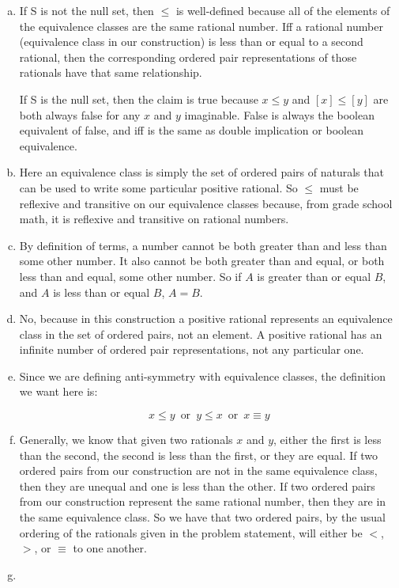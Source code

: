 \documentclass{article}
\begin{document}
\begin{enumerate}[a)]
\item
If S is not the null set, then $\le$ is well-defined because all of the elements
of
the equivalence classes are the same rational number. Iff a rational number
(equivalence class in our construction) is less than or equal to a second
rational, then the corresponding ordered pair representations of those rationals
have that same relationship. 

If S is the null set, then the claim is true because $x \le y$ and $[x] \le
[y]$ are both always false for any $x$ and $y$ imaginable. False is always
the boolean equivalent of false, and iff is the same as double implication
or boolean equivalence.

\item
Here an equivalence class is simply the set of ordered pairs of naturals that
can be used to
write some particular positive rational. So $\le$ must be reflexive and
transitive
on our equivalence classes because, from grade school math, it is reflexive and
transitive on rational numbers.

\item
By definition of terms, a number cannot be both greater than and less than some
other number. It also cannot be both greater than and equal, or both less than
and equal, some other number. So if $A$ is greater than or equal $B$, and $A$
is less than or equal $B$, $A = B$.

\item
No, because in this construction a positive rational represents an equivalence
class in the set of ordered pairs, not an element. A positive rational has an
infinite number of ordered pair representations, not any particular one.

\item
Since we are defining anti-symmetry with equivalence classes, the definition we
want here is:

\[
x \le y \hspace{6pt} \text{or} \hspace{6pt} y \le x \hspace{6pt} \text{or}
\hspace{6pt} x \equiv y 
\]

\item
Generally, we know that given two rationals $x$ and $y$, either the first is
less than the second, the second is less than the first, or they are equal.
If two ordered pairs from our construction are not in the same equivalence
class, then they are unequal and one is less than the other. If two ordered
pairs from our construction represent the same rational number,
then they are in the same equivalence class. So we have that two ordered pairs,
by the usual ordering of the rationals given in the problem statement, will
either be $<$, $>$, or $\equiv$ to one another.

\item

\end{enumerate}
\end{document}
